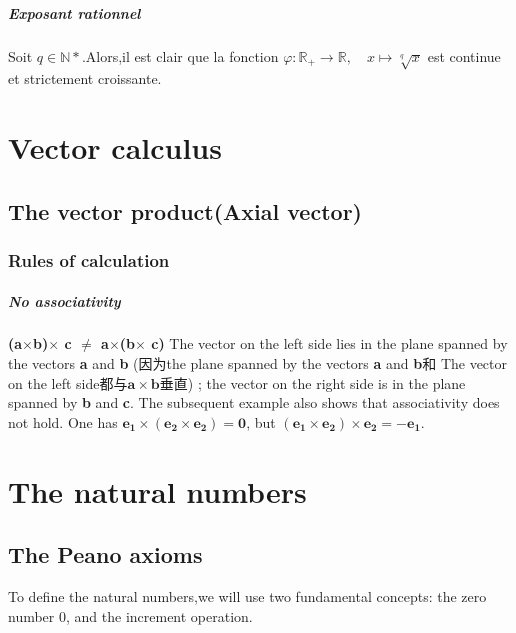 \documentclass[12pt]{book}
\theoremstyle{definition}\newtheorem{dfn}{Définition}[chapter]
\theoremstyle{plain}\newtheorem{thm}{Théorème}[chapter]
\theoremstyle{plain}\newtheorem{prp}{Proposition}[chapter]
\theoremstyle{plain}\newtheorem{lem}{\bf Lemme}[chapter]
\theoremstyle{plain}\newtheorem{axm}{\bf Axiome}[chapter]
\theoremstyle{plain}\newtheorem{lmm}{\bf Lemme}[chapter]
\theoremstyle{plain}\newtheorem{cor}{\bf Corollaire}[chapter]
\theoremstyle{remark}\newtheorem{rem}{Remarque}[chapter]
\begin{document}
        \paragraph{Exposant rationnel}
        Soit $q\in \mathbb{N*}$.Alors,il est clair que la fonction $\varphi:\mathbb{R_+}\longrightarrow \mathbb{R},\quad x\longmapsto \sqrt[q]{x} $  est continue et strictement croissante.






        \chapter{Vector calculus}
        \section{The vector product(Axial vector)}
        \subsection{Rules of calculation}
        \paragraph{No associativity}
        \textbf{(a$\times$b)$\times$ c $\neq$ a$\times$(b$\times$ c)
        }     The vector on the left side lies in the plane spanned by the vectors \textbf{a} and \textbf{b} (因为the plane spanned by the vectors \textbf{a} and \textbf{b}和 The vector on the left side都与$\mathbf{a}\times\mathbf{b}$垂直) ; the vector on the right side is in the plane spanned by \textbf{b} and \textbf{c}. The subsequent example also shows that associativity does not hold. One has {$\mathbf{e_1}\times( \mathbf{e_2}\times \mathbf{e_2}) =\mathbf{0}$}, but {$(\mathbf{e_1}\times \mathbf{e_2})\times \mathbf{e_2} =\mathbf{-e_1}$}.






\chapter{The natural numbers}
\section{The Peano axioms}

To define the natural numbers,we will use two fundamental concepts: the zero number 0, and the increment operation.
\end{document}
